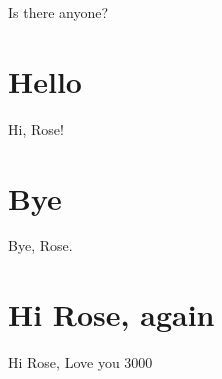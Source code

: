 \documentclass[10pt,a4paper]{article}
\begin{document}
	Is there anyone? 
	\section{Hello}
	Hi, Rose!
	\section{Bye}
	Bye, Rose.
	\section{Hi Rose, again}
	Hi Rose, Love you 3000
\end{document}

